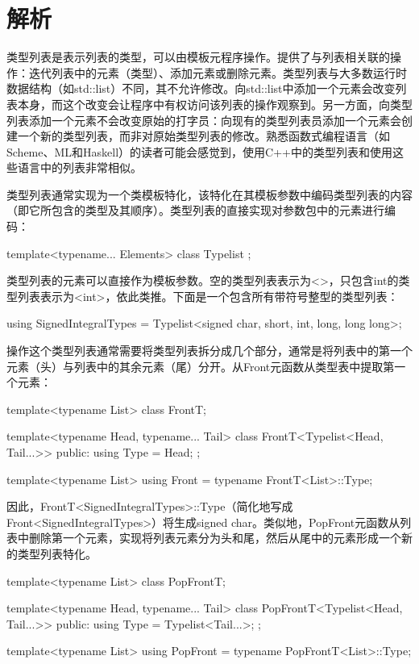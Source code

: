 \section{解析}
类型列表是表示列表的类型，可以由模板元程序操作。提供了与列表相关联的操作：迭代列表中的元素（类型）、添加元素或删除元素。类型列表与大多数运行时数据结构（如std::list）不同，其不允许修改。向std::list中添加一个元素会改变列表本身，而这个改变会让程序中有权访问该列表的操作观察到。另一方面，向类型列表添加一个元素不会改变原始的打字员：向现有的类型列表员添加一个元素会创建一个新的类型列表，而非对原始类型列表的修改。熟悉函数式编程语言（如Scheme、ML和Haskell）的读者可能会感觉到，使用C++中的类型列表和使用这些语言中的列表非常相似。

类型列表通常实现为一个类模板特化，该特化在其模板参数中编码类型列表的内容（即它所包含的类型及其顺序）。类型列表的直接实现对参数包中的元素进行编码：

\begin{cpp}
template<typename... Elements>
class Typelist
{
};
\end{cpp}

类型列表的元素可以直接作为模板参数。空的类型列表表示为<>，只包含int的类型列表表示为<int>，依此类推。下面是一个包含所有带符号整型的类型列表：

\begin{cpp}
using SignedIntegralTypes =
			Typelist<signed char, short, int, long, long long>;
\end{cpp}

操作这个类型列表通常需要将类型列表拆分成几个部分，通常是将列表中的第一个元素（头）与列表中的其余元素（尾）分开。从Front元函数从类型表中提取第一个元素：

\begin{cpp}
template<typename List>
class FrontT;

template<typename Head, typename... Tail>
class FrontT<Typelist<Head, Tail...>>
{
	public:
	using Type = Head;
};

template<typename List>
using Front = typename FrontT<List>::Type;
\end{cpp}

因此，FrontT<SignedIntegralTypes>::Type（简化地写成Front<SignedIntegralTypes>）将生成signed char。类似地，PopFront元函数从列表中删除第一个元素，实现将列表元素分为头和尾，然后从尾中的元素形成一个新的类型列表特化。

\begin{cpp}
template<typename List>
class PopFrontT;

template<typename Head, typename... Tail>
class PopFrontT<Typelist<Head, Tail...>> {
	public:
	using Type = Typelist<Tail...>;
};

template<typename List>
using PopFront = typename PopFrontT<List>::Type;
\end{cpp}


